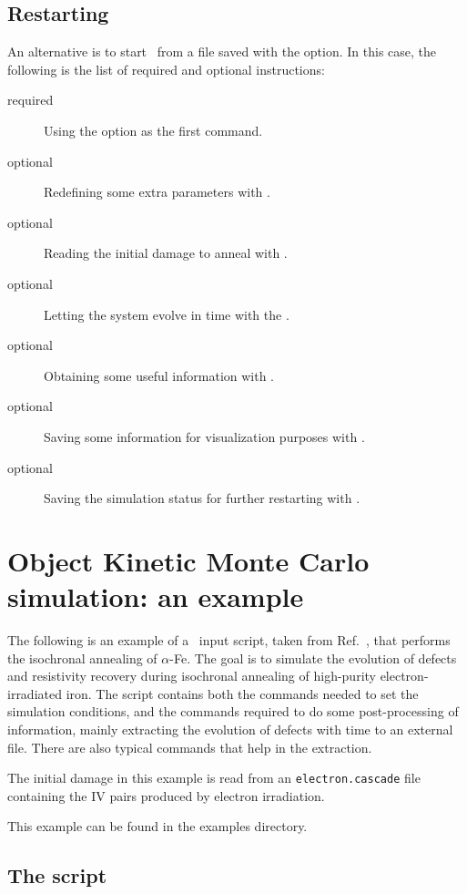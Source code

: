 \subsection{Restarting}

An alternative is to start \MMonCa\ from a file saved with the  option. In this case, the following is the list of required and optional instructions:
\begin{description}
\item [required] Using the  option as the first command.
\item [optional] Redefining some extra parameters with .
\item [optional] Reading the initial damage to anneal with .
\item [optional] Letting the system evolve in time with the .
\item [optional] Obtaining some useful information with .
\item [optional] Saving some information for visualization purposes with .
\item [optional] Saving the simulation status for further restarting with .
\end{description}


\section{Object Kinetic Monte Carlo simulation: an example}

The following is an example of a \MMonCa\ input script, taken from Ref.~\cite{MARTIN-BRAGADO-CPC13}, that performs the isochronal annealing of $\alpha$-Fe. The goal is to simulate the evolution of defects and resistivity recovery during isochronal annealing of high-purity electron-irradiated iron. The script contains both the commands needed to set the simulation conditions, and the commands required to do some post-processing of information, mainly extracting the evolution of defects with time to an external file. There are also typical  commands that help in the extraction. 

The initial damage in this example is read from an {\tt electron.cascade} file containing the IV pairs produced by electron irradiation.

This example can be found in the {\param examples} directory.

\subsection{The script}

